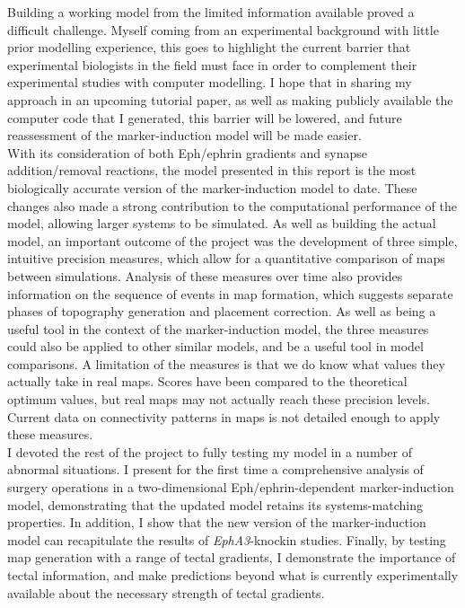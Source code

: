 \documentclass[11pt]{"article"}
\begin{document}
{
Building a working model from the limited information available proved a difficult challenge. Myself coming from an experimental background with little prior modelling experience, this goes to highlight the current barrier that experimental biologists in the field must face in order to complement their experimental studies with computer modelling. I hope that in sharing my approach in an upcoming tutorial paper, as well as making publicly available the computer code that I generated, this barrier will be lowered, and future reassessment of the marker-induction model will be made easier. \\

With its consideration of both Eph/ephrin gradients and synapse addition/removal reactions, the model presented in this report is the most biologically accurate version of the marker-induction model to date. These changes also made a strong contribution to the computational performance of the model, allowing larger systems to be simulated. As well as building the actual model, an important outcome of the project was the development of three simple, intuitive precision measures, which allow for a quantitative comparison of maps between simulations. Analysis of these measures over time also provides information on the sequence of events in map formation, which suggests separate phases of topography generation and placement correction. As well as being a useful tool in the context of the marker-induction model, the three measures could also be applied to other similar models, and be a useful tool in model comparisons. A limitation of the measures is that we do know what values they actually take in real maps. Scores have been compared to the theoretical optimum values, but  real maps may not actually reach these precision levels. Current data on connectivity patterns in maps is not detailed enough to apply these measures. \\


I devoted the rest of the project to fully testing my model in a number of abnormal situations. I present for the first time a comprehensive analysis of surgery operations in a two-dimensional Eph/ephrin-dependent marker-induction model, demonstrating that the updated model retains its systems-matching properties. In addition, I show that the new version of the marker-induction model can recapitulate the results of \textit{EphA3}-knockin studies. Finally, by testing map generation with a range of tectal gradients, I demonstrate the importance of tectal information, and make predictions beyond what is currently experimentally available about the necessary strength of tectal gradients. \par
}
\end{document}
